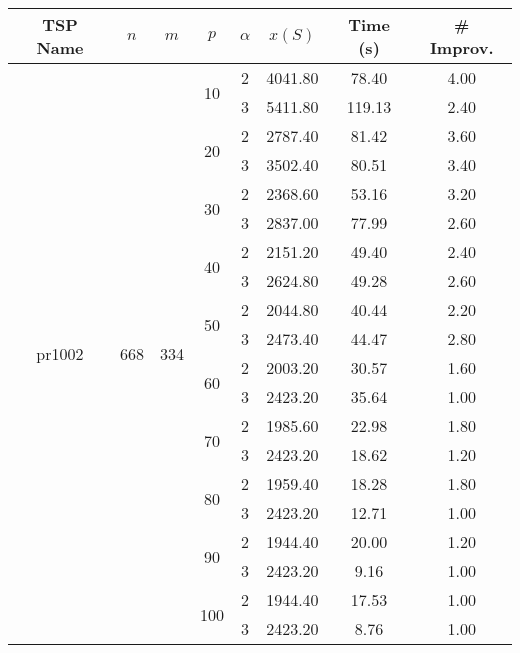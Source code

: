 \begin{tabular}{|ccccc|ccc|}
\toprule
       TSP Name & $n$ & $m$ & $p$ & $\alpha$   & $x(S)$ &  Time (s) &  \# Improv. \\
\midrule
\multirow{20}{*}{pr1002} & \multirow{20}{*}{668} & \multirow{20}{*}{334} & \multirow{2}{*}{10} & 2 & 4041.80 &  78.40 &     4.00 \\
       &     &     &     & 3 & 5411.80 & 119.13 &     2.40 \\
\cline{4-8}
       &     &     & \multirow{2}{*}{20} & 2 & 2787.40 &  81.42 &     3.60 \\
       &     &     &     & 3 & 3502.40 &  80.51 &     3.40 \\
\cline{4-8}
       &     &     & \multirow{2}{*}{30} & 2 & 2368.60 &  53.16 &     3.20 \\
       &     &     &     & 3 & 2837.00 &  77.99 &     2.60 \\
\cline{4-8}
       &     &     & \multirow{2}{*}{40} & 2 & 2151.20 &  49.40 &     2.40 \\
       &     &     &     & 3 & 2624.80 &  49.28 &     2.60 \\
\cline{4-8}
       &     &     & \multirow{2}{*}{50} & 2 & 2044.80 &  40.44 &     2.20 \\
       &     &     &     & 3 & 2473.40 &  44.47 &     2.80 \\
\cline{4-8}
       &     &     & \multirow{2}{*}{60} & 2 & 2003.20 &  30.57 &     1.60 \\
       &     &     &     & 3 & 2423.20 &  35.64 &     1.00 \\
\cline{4-8}
       &     &     & \multirow{2}{*}{70} & 2 & 1985.60 &  22.98 &     1.80 \\
       &     &     &     & 3 & 2423.20 &  18.62 &     1.20 \\
\cline{4-8}
       &     &     & \multirow{2}{*}{80} & 2 & 1959.40 &  18.28 &     1.80 \\
       &     &     &     & 3 & 2423.20 &  12.71 &     1.00 \\
\cline{4-8}
       &     &     & \multirow{2}{*}{90} & 2 & 1944.40 &  20.00 &     1.20 \\
       &     &     &     & 3 & 2423.20 &   9.16 &     1.00 \\
\cline{4-8}
       &     &     & \multirow{2}{*}{100} & 2 & 1944.40 &  17.53 &     1.00 \\
       &     &     &     & 3 & 2423.20 &   8.76 &     1.00 \\
\bottomrule
\end{tabular}
